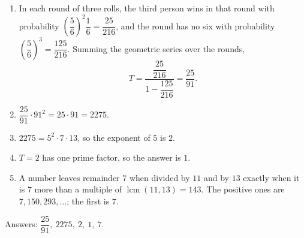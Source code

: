 \begin{enumerate}
\item In each round of three rolls, the third person wins in that round with probability $\left(\dfrac{5}{6}\right)^2\dfrac{1}{6}=\dfrac{25}{216}$, and the round has no six with probability $\left(\dfrac{5}{6}\right)^3=\dfrac{125}{216}$. Summing the geometric series over the rounds,
\[
T=\dfrac{\dfrac{25}{216}}{1-\dfrac{125}{216}}=\dfrac{25}{91}.
\]
\item $\dfrac{25}{91}\cdot91^2=25\cdot91=2275$.
\item $2275=5^2\cdot7\cdot13$, so the exponent of $5$ is $2$.
\item $T=2$ has one prime factor, so the answer is $1$.
\item A number leaves remainder $7$ when divided by $11$ and by $13$ exactly when it is $7$ more than a multiple of $\operatorname{lcm}(11,13)=143$. The positive ones are $7,150,293,\dots$; the first is $\boxed{7}$.
\end{enumerate}
Answers: $\dfrac{25}{91},\ 2275,\ 2,\ 1,\ 7$.
